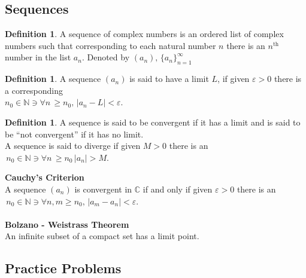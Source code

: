 \documentclass[11pt,a4paper]{article}
\theoremstyle{definition}
\newtheorem{definition}[thm]{Definition}
\begin{document}
{\color[wave]{485}\subsection{Sequences}}

\begin{definition}
A sequence of complex numbers is an ordered list of complex numbers such that corresponding to each natural number $n$ there is an $n^{\text{th}}$ number in the list $a_n$. Denoted by $(a_n),\,\big\{a_n\big\}^{\infty}_{n = 1}$
\end{definition}

\begin{definition}
A sequence $(a_n)$ is said to have a limit $L$, if given $\varepsilon > 0$ there is a corresponding\\ $n_0 \in \mathbb{N} \ni \forall n\,\geq n_0, \, \left|a_n - L\right| < \varepsilon$.
\end{definition}

\begin{definition}
A sequence is said to be convergent if it has a limit and is said to be ``not convergent'' if it has no limit.\\


A sequence is said to diverge if given $M> 0$ there is an $\, n_0 \in \mathbb{N} \ni \forall n\, \geq n_0 \, \left|a_n\right| > M$.
\end{definition}

{\color[wave]{485}\textbf{Cauchy's Criterion}}\\
A sequence $(a_n)$ is convergent in $\mathbb{C}$ if and only if given $\varepsilon > 0$ there is an\\ $\, n_0 \in \mathbb{N} \ni \forall n, m\geq n_0, \, \left|a_m - a_n\right| < \varepsilon$.\\\\



{\color[wave]{485}\textbf{Bolzano - Weistrass Theorem}}\\
An infinite subset of a compact set has a limit point.\\
{\color[wave]{485}\subsection{Practice Problems}}
\end{document}
